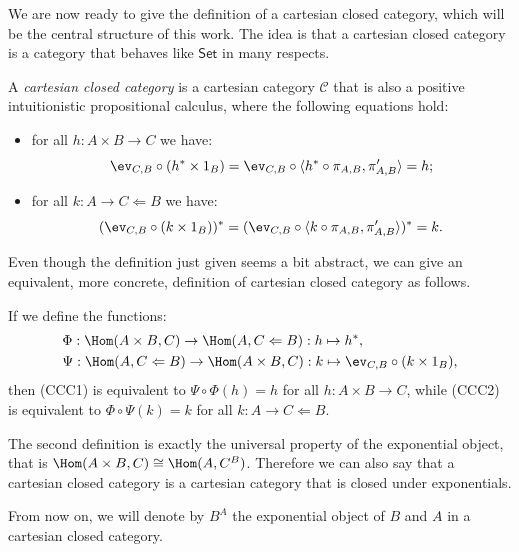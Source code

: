 We are now ready to give the definition of a cartesian closed category, which will be the central structure of this work. The idea is that a cartesian closed category is a category that behaves like $\mathsf{Set}$ in many respects.

\begin{definition}
    A \textit{cartesian closed category} is a cartesian category $\mathcal C$ that is also a positive intuitionistic propositional calculus, where the following equations hold:
    \begin{itemize}
        \item[(\textnormal{CCC1})] for all $h : A \times B \to C$ we have:
        \[ \ev_{C,B} \circ (h^* \times 1_B) = \ev_{C,B} \circ \langle h^* \circ \pi_{A,B}, \pi_{A,B}'\rangle = h; \]
        \item[(\textnormal{CCC2})] for all $k : A \to C \Leftarrow B$ we have:
        \[ (\ev_{C,B} \circ (k \times 1_B))^* = (\ev_{C,B} \circ \langle k \circ \pi_{A,B}, \pi_{A,B}'\rangle)^* = k. \]
    \end{itemize} 
\end{definition}

Even though the definition just given seems a bit abstract, we can give an equivalent, more concrete, definition of cartesian closed category as follows.

\begin{remark}
    If we define the functions:
    \begin{align*}
        & \Phi : \Hom(A \times B, C) \to \Hom(A, C \Leftarrow B) : h \mapsto h^*, \\
        & \Psi : \Hom(A, C \Leftarrow B) \to \Hom(A \times B, C) : k \mapsto \ev_{C,B} \circ (k \times 1_B),
    \end{align*}
    then (CCC1) is equivalent to $\Psi \circ \Phi(h) = h$ for all $h : A \times B \to C$, while (CCC2) is equivalent to $\Phi \circ \Psi(k) = k$ for all $k : A \to C \Leftarrow B$.
\end{remark}

The second definition is exactly the universal property of the exponential object, that is $\Hom(A \times B, C) \cong \Hom(A, C^B)$. Therefore we can also say that a cartesian closed category is a cartesian category that is closed under exponentials.

\begin{notation}
    From now on, we will denote by $B^A$ the exponential object of $B$ and $A$ in a cartesian closed category.
\end{notation}

